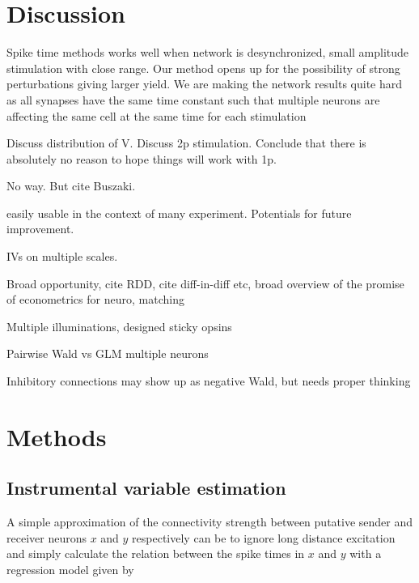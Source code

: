 \documentclass[11pt]{article}
\begin{document}
\section{Discussion}
Spike time methods works well when network is desynchronized, small amplitude stimulation with close range. Our method opens up for the possibility of strong perturbations giving larger yield.
We are making the network results quite hard as all synapses have the same time constant such that multiple neurons are affecting the same cell at the same time for each stimulation


Discuss distribution of V. Discuss 2p stimulation.  Conclude that there is absolutely no reason to hope things will work with 1p.

No way. But cite Buszaki.

easily usable in the context of many experiment. Potentials for future improvement.

IVs on multiple scales. 

Broad opportunity, cite RDD, cite diff-in-diff etc, broad overview of the promise of econometrics for neuro, matching

Multiple illuminations, designed sticky opsins

Pairwise Wald vs GLM multiple neurons

Inhibitory connections may show up as negative Wald, but needs proper thinking

\section{Methods}
\subsection{Instrumental variable estimation}
A simple approximation of the connectivity strength between putative sender and receiver neurons $ x $ and $ y $ respectively can be to ignore long distance excitation and simply calculate the relation between the spike times in $ x $ and $ y $ with a regression model given by
\end{document}
